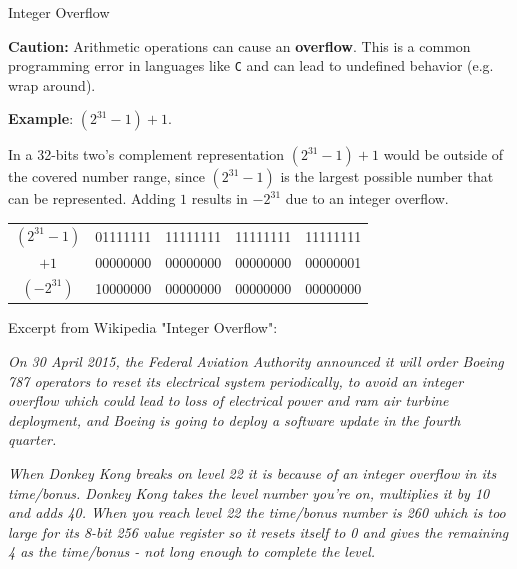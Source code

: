 \documentclass[11pt,compress,t,notes=noshow, xcolor=table]{beamer}
\begin{document}
\begin{vbframe}{Integer Overflow}

\textbf{Caution:} Arithmetic operations can cause an \textbf{overflow}.
This is a common programming error in languages like  \texttt{C} and can lead to undefined behavior (e.g. wrap around).

\lz

\textbf{Example}: $(2^{31} - 1) + 1$.

In a 32-bits two's complement representation $(2^{31} - 1) + 1$ would be outside of the covered number range, since $(2^{31} - 1)$ is the largest possible number that can be represented. Adding $1$ results in $-2^{31}$ due to an integer overflow.

\lz 

\centering
\begin{tabular}{c|cccc}
$(2^{31} - 1)$ & 01111111 & 11111111 & 11111111 & 11111111 \\
$+ 1$ & 00000000 & 00000000 & 00000000 & 00000001 \\
\hline
$(-2^{31})$ & 10000000 & 00000000 & 00000000 & 00000000 \\
\end{tabular}

\framebreak

Excerpt from Wikipedia "Integer Overflow":

\lz

\emph{
On 30 April 2015, the Federal Aviation Authority announced it will order Boeing 787 operators to reset its electrical system periodically, to avoid an integer overflow which could lead to loss of electrical power and ram air turbine deployment, and Boeing is going to deploy a software update in the fourth quarter.}

\lz

\emph{When Donkey Kong breaks on level 22 it is because of an integer overflow in its time/bonus. Donkey Kong takes the level number you're on, multiplies it by 10 and adds 40. When you reach level 22 the time/bonus number is 260 which is too large for its 8-bit 256 value register so it resets itself to 0 and gives the remaining 4 as the time/bonus - not long enough to complete the level.}


\end{vbframe}
\end{document}
